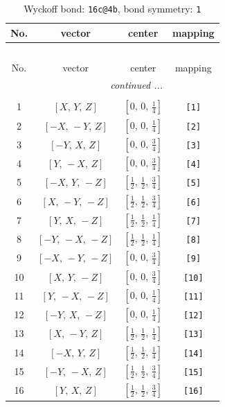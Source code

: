 \documentclass[fleqn,8pt]{jsarticle}
\begin{document}
\begin{longtable}{cccc}
\caption{Wyckoff bond: {\tt 16c@4b}, bond symmetry: {\tt 1}}
 \\
 \hline \hline
No. & vector & center & mapping \\ \hline \endfirsthead

\multicolumn{3}{l}{\tablename\ \thetable{}} \\
 \hline \hline
No. & vector & center & mapping \\ \hline \endhead

 \hline \hline
\multicolumn{3}{r}{\footnotesize\it continued ...} \\ \endfoot

 \hline \hline
\multicolumn{3}{r}{} \\ \endlastfoot

1 & $\left[ X,\, Y,\, Z \right]$ & $\left[ 0,\, 0,\, \frac{1}{4} \right]$ & {\tt [1]} \\ \hline
2 & $\left[ - X,\, - Y,\, Z \right]$ & $\left[ 0,\, 0,\, \frac{1}{4} \right]$ & {\tt [2]} \\ \hline
3 & $\left[ - Y,\, X,\, Z \right]$ & $\left[ 0,\, 0,\, \frac{3}{4} \right]$ & {\tt [3]} \\ \hline
4 & $\left[ Y,\, - X,\, Z \right]$ & $\left[ 0,\, 0,\, \frac{3}{4} \right]$ & {\tt [4]} \\ \hline
5 & $\left[ - X,\, Y,\, - Z \right]$ & $\left[ \frac{1}{2},\, \frac{1}{2},\, \frac{3}{4} \right]$ & {\tt [5]} \\ \hline
6 & $\left[ X,\, - Y,\, - Z \right]$ & $\left[ \frac{1}{2},\, \frac{1}{2},\, \frac{3}{4} \right]$ & {\tt [6]} \\ \hline
7 & $\left[ Y,\, X,\, - Z \right]$ & $\left[ \frac{1}{2},\, \frac{1}{2},\, \frac{1}{4} \right]$ & {\tt [7]} \\ \hline
8 & $\left[ - Y,\, - X,\, - Z \right]$ & $\left[ \frac{1}{2},\, \frac{1}{2},\, \frac{1}{4} \right]$ & {\tt [8]} \\ \hline
9 & $\left[ - X,\, - Y,\, - Z \right]$ & $\left[ 0,\, 0,\, \frac{3}{4} \right]$ & {\tt [9]} \\ \hline
10 & $\left[ X,\, Y,\, - Z \right]$ & $\left[ 0,\, 0,\, \frac{3}{4} \right]$ & {\tt [10]} \\ \hline
11 & $\left[ Y,\, - X,\, - Z \right]$ & $\left[ 0,\, 0,\, \frac{1}{4} \right]$ & {\tt [11]} \\ \hline
12 & $\left[ - Y,\, X,\, - Z \right]$ & $\left[ 0,\, 0,\, \frac{1}{4} \right]$ & {\tt [12]} \\ \hline
13 & $\left[ X,\, - Y,\, Z \right]$ & $\left[ \frac{1}{2},\, \frac{1}{2},\, \frac{1}{4} \right]$ & {\tt [13]} \\ \hline
14 & $\left[ - X,\, Y,\, Z \right]$ & $\left[ \frac{1}{2},\, \frac{1}{2},\, \frac{1}{4} \right]$ & {\tt [14]} \\ \hline
15 & $\left[ - Y,\, - X,\, Z \right]$ & $\left[ \frac{1}{2},\, \frac{1}{2},\, \frac{3}{4} \right]$ & {\tt [15]} \\ \hline
16 & $\left[ Y,\, X,\, Z \right]$ & $\left[ \frac{1}{2},\, \frac{1}{2},\, \frac{3}{4} \right]$ & {\tt [16]} \\
\end{longtable}
\end{document}
